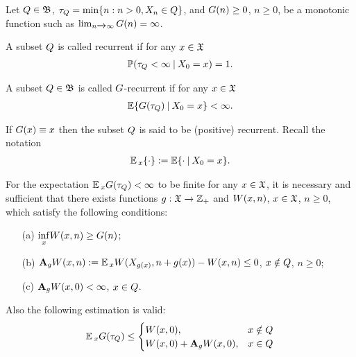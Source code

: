 	Let $Q \in \mathfrak{B}$, $\tau_{Q} = \min\{n : n > 0, X_{n} \in Q\}$, and $G(n) \geq 0$, $n \geq 0$, be a monotonic function such as $\lim_{n \xrightarrow{} \infty}G(n) = \infty$.
	\begin{definition}
		A subset $Q$ is called recurrent if for any $x \in \mathfrak{X}$
		\begin{gather*}
		\operatorname*{\mathbb{P}}(\tau_{Q} < \infty \: | \: X_{0} = x) = 1.
		\end{gather*}
	\end{definition}
	\begin{definition}
		A subset $Q \in \mathfrak{B}$ is called $G$-recurrent if for any $x \in \mathfrak{X}$
		\begin{gather}
		\operatorname*{\mathbb{E}}\{G(\tau_{Q}) \: | \: X_{0} = x\} < \infty.
		\end{gather}
	\end{definition}
	If $G(x) \equiv x$ then the subset $Q$ is said to be (positive) recurrent. Recall the notation
	\begin{gather}
	\operatorname*{\mathbb{E}}{}_{x}\{\cdot\} := \operatorname*{\mathbb{E}}\{\cdot \: | \: X_{0} = x\}.
	\end{gather}
	\begin{repeated_theorem}
		For the expectation $\operatorname*{\mathbb{E}}{}_{x}G(\tau_{Q}) < \infty$ to be finite for any $x \in \mathfrak{X}$, it is necessary and sufficient that there exists functions $g:\mathfrak{X} \xrightarrow{} \mathbb{Z}_{+}$ and $W(x, n)$, $x \in \mathfrak{X}$, $n \geq 0$, which satisfy the following conditions:
		\begin{enumerate}
			\item[(a)] $\underset{x}{\inf}W(x, n) \geq G(n)$;
			\item[(b)] $\mathbf{A}_{g}W(x, n) := \operatorname*{\mathbb{E}}{}_{x}W(X_{g(x)}, n+g(x)) - W(x, n) \leq 0$, $x \notin Q$, $n \geq 0$;
			\item[(c)] $\mathbf{A}_{g}W(x, 0) < \infty$, $x \in Q$.
		\end{enumerate}
		Also the following estimation is valid:
		\begin{gather}
		\operatorname*{\mathbb{E}}{}_{x}G(\tau_{Q}) \leq \begin{cases}
		W(x, 0), & x \notin Q \\
		W(x, 0) + \mathbf{A}_{g}W(x, 0), & x \in Q
		\end{cases}
		\label{main_G_W_inequality}
		\end{gather}
		\label{generalized_kalashnikov_theorem}
	\end{repeated_theorem}
